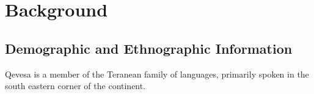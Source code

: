 \documentclass[grammar]{subfiles}
\begin{document}
\chapter{Background}
\label{ch:background}

\section{Demographic and Ethnographic Information}
\label{sec:bg_demographics}

Qevesa is a member of the Teranean family of languages, primarily spoken in the south eastern corner of the continent. 

\tbw
\end{document}
